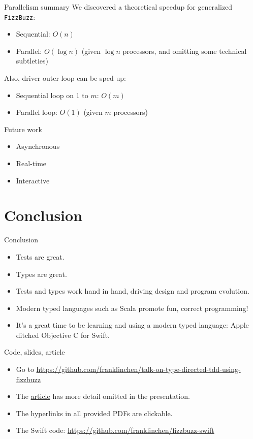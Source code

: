 \begin{frame}{Parallelism summary}
  We discovered a theoretical speedup for generalized \texttt{FizzBuzz}:
  \begin{itemize}
  \item Sequential: $O(n)$
  \item Parallel: $O(\log n)$ (given $\log n$ processors, and omitting some technical subtleties)
  \end{itemize}

  Also, driver outer loop can be sped up:
  \begin{itemize}
  \item Sequential loop on 1 to $m$: $O(m)$
  \item Parallel loop: $O(1)$ (given $m$ processors)
  \end{itemize}
\end{frame}

\begin{frame}{Future work}
  \begin{itemize}
  \item Asynchronous
  \item Real-time
  \item Interactive
  \end{itemize}
\end{frame}

\section{Conclusion}

\begin{frame}{Conclusion}
  \begin{itemize}
  \item \alert{Tests} are great.
  \item \alert{Types} are great.
  \item Tests and types work hand in hand, driving design and program evolution.
  \item Modern typed languages such as Scala promote fun, correct programming!
  \item It's a great time to be learning and using a modern typed language: Apple ditched Objective C for Swift.
  \end{itemize}

  \begin{block}{Code, slides, article}
    \begin{itemize}
    \item Go to  \url{https://github.com/franklinchen/talk-on-type-directed-tdd-using-fizzbuzz}
    \item The \href{https://github.com/FranklinChen/talk-on-type-directed-tdd-using-fizzbuzz/blob/master/doc/article.pdf}{article} has more detail omitted in the presentation.
    \item The hyperlinks in all provided PDFs are clickable.
    \item The Swift code: \url{https://github.com/franklinchen/fizzbuzz-swift}
    \end{itemize}
  \end{block}
\end{frame}

